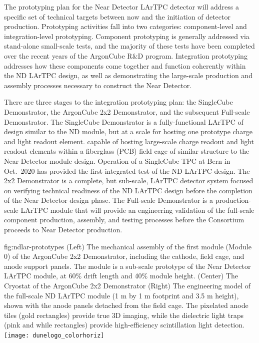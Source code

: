 The prototyping plan for the Near Detector LArTPC detector will address a specific set of technical targets between now and the initiation of detector production.  
Prototyping activities fall into two categories: component-level and integration-level prototyping.  
Component prototyping is generally addressed via stand-alone small-scale tests, and the majority of these tests have been completed over the recent years of the ArgonCube R\&D program.
Integration prototyping addresses how these components come together and function coherently within the ND LArTPC design, as well as demonstrating the large-scale production and assembly processes necessary to construct the Near Detector.

There are three stages to the integration prototyping plan: the SingleCube Demonstrator, the ArgonCube 2x2 Demonstrator, and the subsequent Full-scale Demonstrator.
The SingleCube Demonstrator is a fully-functional LArTPC of design similar to the ND module, but at a scale for hosting one prototype charge and light readout element. 
capable of hosting large-scale charge readout and light readout elements within a fiberglass (PCB) field cage of similar structure to the Near Detector module design.
Operation of a SingleCube TPC at Bern in Oct.~2020 has provided the first integrated test of the ND LArTPC design. 
The 2x2 Demonstrator is a complete, but sub-scale, LArTPC detector system focused on verifying technical readiness of the ND LArTPC design before the completion of the Near Detector design phase.  
The Full-scale Demonstrator is a production-scale LArTPC module that will provide an engineering validation of the full-scale component production, assembly, and testing processes before the Consortium proceeds to Near Detector production.

\begin{dunefigure}{fig:ndlar-prototypes}
{(Left) The mechanical assembly of the first module (Module 0) of the ArgonCube 2x2 Demonstrator, including the cathode, field cage, and anode support panels.  The module is a sub-scale prototype of the Near Detector LArTPC module, at 60\% drift length and 40\% module height.  (Center) The Cryostat of the ArgonCube 2x2 Demonstrator (Right) The engineering model of the full-scale ND LArTPC module (1 m by 1 m footprint and 3.5 m height), shown with the anode panels detached from the field cage.  The pixelated anode tiles (gold rectangles) provide true 3D imaging, while the dielectric light traps (pink and while rectangles) provide high-efficiency scintillation light detection.}
\texttt{[image: dunelogo\_colorhoriz]}
\end{dunefigure}

